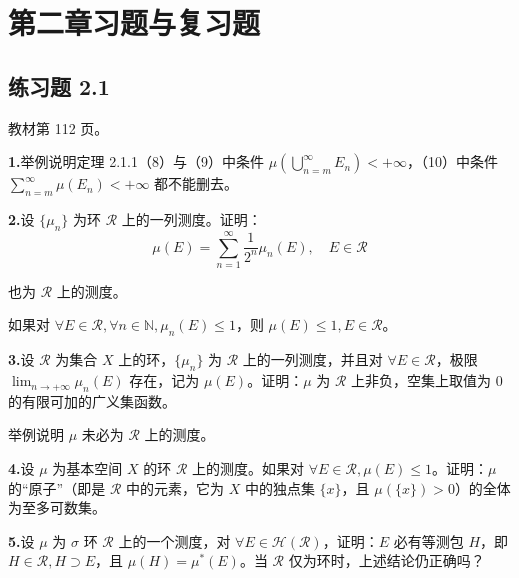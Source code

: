 \documentclass[11pt,a4paper]{article}
\begin{document}
\clearpage{}\section*{第二章习题与复习题}
\subsection*{练习题 2.1}
\noindent 教材第 112 页。
\par{}\noindent\textbf{1.}\quad 举例说明定理 2.1.1（8）与（9）中条件 $\mu\left(\bigcup_{n=m}^{\infty}E_n\right)<+\infty$，（10）中条件 $\sum_{n=m}^{\infty}\mu(E_n)<+\infty$ 都不能删去。
\par{}\noindent\textbf{2.}\quad 设 $\{\mu_n\}$ 为环 $\mathcal R$ 上的一列测度。证明：
\[\mu(E)=\sum_{n=1}^{\infty}\frac1{2^n}\mu_n(E),\quad E\in\mathcal R\]
\par\noindent 也为 $\mathcal R$ 上的测度。
\par\noindent 如果对 $\forall E\in\mathcal R,\forall n\in\mathbb N,\mu_n(E)\leq1$，则 $\mu(E)\leq1,E\in\mathcal R$。
\par{}\noindent\textbf{3.}\quad 设 $\mathcal R$ 为集合 $X$ 上的环，$\{\mu_n\}$ 为 $\mathcal R$ 上的一列测度，并且对 $\forall E\in\mathcal R$，极限 $\lim_{n\to+\infty}\mu_n(E)$ 存在，记为 $\mu(E)$。证明：$\mu$ 为 $\mathcal R$ 上非负，空集上取值为 $0$ 的有限可加的广义集函数。
\par\noindent 举例说明 $\mu$ 未必为 $\mathcal R$ 上的测度。
\par{}\noindent\textbf{4.}\quad 设 $\mu$ 为基本空间 $X$ 的环 $\mathcal R$ 上的测度。如果对 $\forall E\in\mathcal R,\mu(E)\leq1$。证明：$\mu$ 的“原子”（即是 $\mathcal R$ 中的元素，它为 $X$ 中的独点集 $\{x\}$，且 $\mu(\{x\})>0$）的全体为至多可数集。
\par{}\noindent\textbf{5.}\quad 设 $\mu$ 为 $\sigma$ 环 $\mathcal R$ 上的一个测度，对 $\forall E\in\mathcal H(\mathcal R)$，证明：$E$ 必有等测包 $H$，即 $H\in\mathcal R,H\supset E$，且 $\mu(H)=\mu^*(E)$。当 $\mathcal R$ 仅为环时，上述结论仍正确吗？
\end{document}
